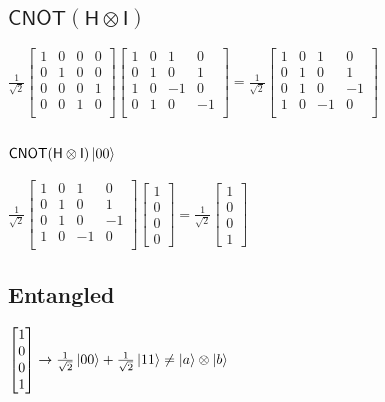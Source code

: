 \documentclass{iansnotes}
\begin{document}
\subsection{$\mathsf{CNOT}(\mathsf{H} \otimes \mathsf{I})$}
$\frac{1}{\sqrt{2}}\begin{bmatrix}
  1 & 0 & 0 & 0 \\
  0 & 1 & 0 & 0 \\
  0 & 0 & 0 & 1 \\
  0 & 0 & 1 & 0 \\
\end{bmatrix}\begin{bmatrix}
  1 & 0 &  1 &  0 \\
  0 & 1 &  0 &  1 \\
  1 & 0 & -1 &  0 \\
  0 & 1 &  0 & -1 \\
\end{bmatrix}=\frac{1}{\sqrt{2}}\begin{bmatrix}
  1 & 0 &  1 &  0 \\
  0 & 1 &  0 &  1 \\
  0 & 1 &  0 & -1 \\
  1 & 0 & -1 &  0 \\
\end{bmatrix}$

\subsection{$\mathsf{CNOT}(\mathsf{H} \otimes \mathsf{I}) \ket{00}$}
$\frac{1}{\sqrt{2}}\begin{bmatrix}
  1 & 0 &  1 &  0 \\
  0 & 1 &  0 &  1 \\
  0 & 1 &  0 & -1 \\
  1 & 0 & -1 &  0 \\
\end{bmatrix}
\begin{bmatrix} 1 \\ 0 \\ 0 \\ 0 \end{bmatrix} = \frac{1}{\sqrt{2}}\begin{bmatrix} 1 \\ 0 \\ 0 \\ 1 \end{bmatrix} $

\subsection{Entangled}
$\begin{bmatrix} 1 \\ 0 \\ 0 \\ 1 \end{bmatrix} \rightarrow \frac{1}{\sqrt{2}} \ket{00} + \frac{1}{\sqrt{2}} \ket{11} \neq \ket{a} \otimes \ket{b}$
\end{document}

